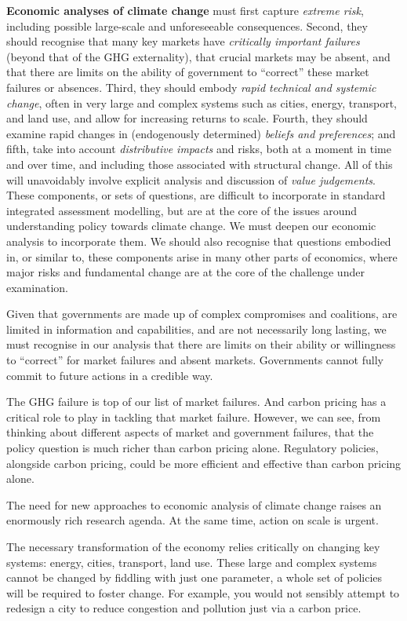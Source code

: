\documentclass[
]{book}
\begin{document}
\textbf{Economic analyses of climate change} must first capture \emph{extreme risk}, including possible large-scale and unforeseeable consequences. Second, they should recognise that many key markets have
\emph{critically important failures} (beyond that of the GHG externality), that crucial markets may be absent,
and that there are limits on the ability of government to ``correct'' these market failures or absences.
Third, they should embody \emph{rapid technical and systemic change}, often in very large and complex
systems such as cities, energy, transport, and land use, and allow for increasing returns to scale.
Fourth, they should examine rapid changes in (endogenously determined) \emph{beliefs and preferences};
and fifth, take into account \emph{distributive impacts} and risks, both at a moment in time and over time, and
including those associated with structural change. All of this will unavoidably involve explicit analysis
and discussion of \emph{value judgements}. These components, or sets of questions, are difficult to
incorporate in standard integrated assessment modelling, but are at the core of the issues around
understanding policy towards climate change. We must deepen our economic analysis to incorporate
them. We should also recognise that questions embodied in, or similar to, these components arise in
many other parts of economics, where major risks and fundamental change are at the core of the
challenge under examination.

Given that governments are made up of complex compromises and coalitions, are limited in
information and capabilities, and are not necessarily long lasting, we must recognise in our analysis
that there are limits on their ability or willingness to ``correct'' for market failures and absent markets.
Governments cannot fully commit to future actions in a credible way.

The GHG failure is top of our list of market failures. And carbon pricing has a critical role to play in
tackling that market failure. However, we can see, from thinking about different aspects of market and
government failures, that the policy question is much richer than carbon pricing alone.
Regulatory
policies, alongside carbon pricing, could be more efficient and effective than carbon pricing alone.

The need for new approaches to economic analysis of climate change raises an enormously rich
research agenda. At the same time, action on scale is urgent.

The necessary transformation of the economy relies critically on changing key systems: energy, cities,
transport, land use. These large and complex systems cannot be changed by fiddling with just one
parameter, a whole set of policies will be required to foster change. For example, you would not sensibly
attempt to redesign a city to reduce congestion and pollution just via a carbon price.
\end{document}
